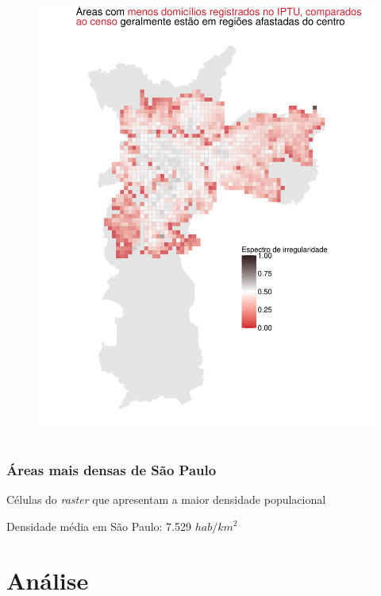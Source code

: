\documentclass[%
    8pt, 
    aspectratio=169,
]{beamer}
\begin{document}
\begin{frame}
\begin{columns}[T]
        \begin{figure}
            \centering
            \includegraphics[width = \linewidth]{imagens/balanco_raster.pdf}
        \end{figure}
    \end{columns}
\end{frame}

\begin{frame}
    \frametitle{Áreas mais densas de São Paulo}

    \begin{table}
        \fontsize{4pt}{10}
        \caption{Células do \textit{raster} que apresentam a maior densidade populacional}
        
        \addtocounter{table}{-1}
    \end{table}

    Densidade média em São Paulo: 7.529 $hab/km^2$
\end{frame}

\section{Análise}
\end{document}
